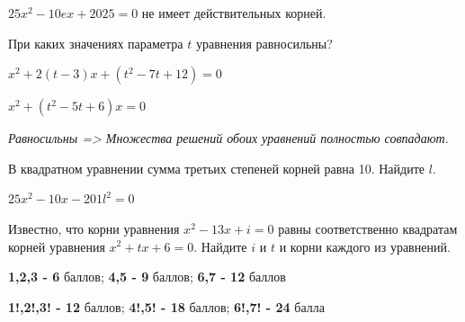  $25x^2-10ex+2025=0$ не имеет действительных корней.
 
  При каких значениях параметра $t$ уравнения равносильны? 

$x^2+2(t-3)x+(t^2-7t+12)=0$ 

$x^2+(t^2-5t+6)x=0$

\textit{Равносильны => Множества решений обоих уравнений полностью совпадают.}

  В квадратном уравнении сумма третьих степеней корней равна 10. Найдите $l$.

 $25x^2-10x-201l^2=0$

  Известно, что корни уравнения $x^2-13x+i=0$ равны соответственно квадратам корней уравнения $x^2+tx+6=0$. Найдите $i$ и $t$ и корни каждого из уравнений.

  \hspace{3mm}

\centerline{\textbf{1,2,3 - 6} баллов; \textbf{4,5 - 9} баллов; \textbf{6,7 - 12} баллов}

\centerline{\textbf{1!,2!,3! - 12} баллов; \textbf{4!,5! - 18} баллов; \textbf{6!,7! - 24} балла}



 